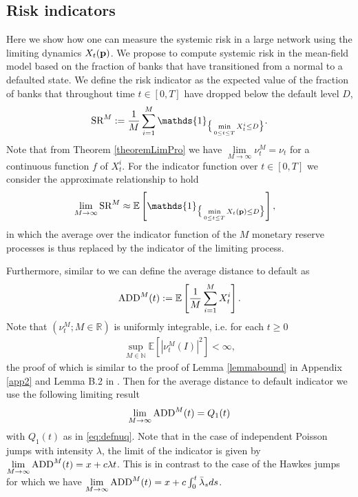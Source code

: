 \documentclass[10pt]{article}
\theoremstyle{plain}
\theoremstyle{definition}
\newcommand{\<}{\langle}
\renewcommand{\>}{\rangle}
\renewcommand{\(}{\left(}
\renewcommand{\)}{\right)}
\renewcommand{\[}{\left[}
\renewcommand{\]}{\right]}
\def \caratt {{\mathds{1}}}
\begin{document}
\subsection{Risk indicators}
Here we show how one can measure the systemic risk in a large network using the limiting dynamics $X_t(\bold{p})$. We propose to compute systemic risk in the mean-field model based on the fraction of banks that
have transitioned from a normal to a defaulted state. We define the risk indicator as the expected
value of the fraction of banks that throughout time $t\in[0,T]$ have dropped below the default
level $D$,
\begin{align}
 \text{\rm SR}^M:=\frac{1}{M}\sum\limits_{i=1}^M\caratt_{\big\{\min\limits_{0\leq t\leq T}
 X_t^i\leq D\big\}}.
\end{align}
Note that from Theorem \ref{theoremLimPro} we have $\lim\limits_{M\rightarrow\infty}\nu_t^M=\nu_t$ for a continuous function $f$ of $X_t^i$. For the indicator function over $t\in [0,T]$ we consider the approximate relationship to hold 
\begin{align}
\lim\limits_{M\rightarrow\infty}\text{\rm SR}^M&\approx \mathbb{E}\left[\caratt_{\big\{\min\limits_{0\leq
t\leq T}X_t(\bold{p})\leq D\big\}}\right],
\end{align}
in which the average over the indicator function of the $M$ monetary reserve processes is thus replaced by the indicator of the limiting process.

Furthermore, similar to \citet{capponi15} we can define the average distance to default as
\begin{align}
\text{\rm ADD}^M(t):=\mathbb{E}\left[\frac{1}{M}\sum\limits_{i=1}^M X_t^i\right].
\end{align}
Note that $(\nu_t^M;M\in\mathbb{R})$ is uniformly integrable, i.e. for each $t\geq 0$
\begin{align}
\sup\limits_{M\in\mathbb{N}}\mathbb{E}\left[\left|\nu_t^M(I)\right|^2\right]<\infty,
\end{align}
the proof of which is similar to the proof of Lemma \ref{lemmabound} in Appendix \ref{app2} and Lemma B.2 in \citet{capponi15}.
Then for the average distance to default indicator we use the following limiting result
\begin{align}
\lim\limits_{M\rightarrow\infty} \text{\rm ADD}^M(t) = Q_1(t)
\end{align}
with $Q_1(t)$ as in \eqref{eq:defnuq}. 
Note that in the case of independent Poisson jumps with intensity $\lambda$, the limit of the
 indicator is given by $\lim\limits_{M\rightarrow\infty}\text{\rm ADD}^M(t)=
x+c\lambda t$. This is in contrast to the case of the Hawkes jumps for which we have
$\lim\limits_{M\rightarrow\infty}\text{\rm ADD}^M(t) = x+c\int_0^t\bar\lambda_sds$.
\end{document}
